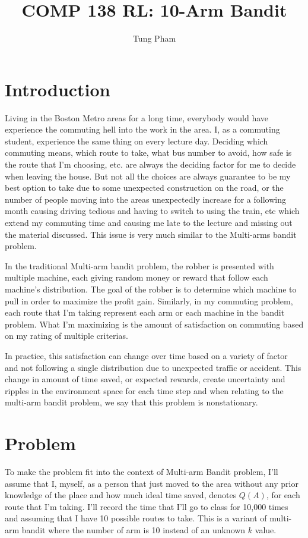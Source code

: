 \documentclass{article}
\title{COMP 138 RL: 10-Arm Bandit}
\author{Tung Pham}
\begin{document}
\maketitle

\section{Introduction}
Living in the Boston Metro areas for a long time, everybody would have
experience the commuting hell into the work in the area. I, as a commuting
student, experience the same thing on every lecture day. Deciding which
commuting means, which route to take, what bus number to avoid, how safe is the
route that I'm choosing, etc. are always the deciding factor for me to decide
when leaving the house. But not all the choices are always guarantee to be my
best option to take due to some unexpected construction on the road, or the
number of people moving into the areas unexpectedly increase for a following
month causing driving tedious and having to switch to using the train, etc
which extend my commuting time and causing me late to the lecture and missing
out the material discussed. This issue is very much similar to the Multi-arms bandit problem.

In the traditional Multi-arm bandit problem, the robber is presented with
multiple machine, each giving random money or reward that follow each machine's
distribution. The goal of the robber is to determine which machine to pull in
order to maximize the profit gain. Similarly, in my commuting problem, each
route that I'm taking represent each arm or each machine in the bandit problem.
What I'm maximizing is the amount of satisfaction on commuting based on my
rating of multiple criterias.

In practice, this satisfaction can change over time based on a variety
of factor and not following a single distribution due to unexpected traffic or
accident. This change in amount of time saved, or expected rewards, create
uncertainty and ripples in the environment space for each time step and when relating to the multi-arm bandit problem, we say that this
problem is nonstationary.

\section{Problem}
To make the problem fit into the context of Multi-arm Bandit problem, I'll
assume that I, myself, as a person that just moved to the area without any prior
knowledge of the place and how much ideal time saved, denotes $Q(A)$, for each
route that I'm taking. I'll record the time that I'll go to class for 10,000 times
and assuming that I have 10 possible routes to take. This is a variant of
multi-arm bandit where the number of arm is 10 instead of an unknown $k$ value.
\end{document}
